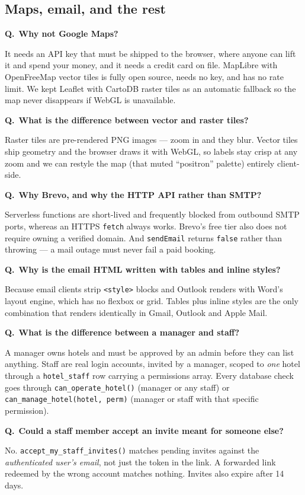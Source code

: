 \documentclass[11pt,a4paper]{article}
\newcommand{\Q}[1]{\vspace{7pt}\noindent\textbf{\color{primary}Q.}~\textbf{#1}\par\vspace{1pt}}
\newcommand{\A}[1]{\noindent #1\par}
\begin{document}
\subsection{Maps, email, and the rest}

\Q{Why not Google Maps?}
\A{It needs an API key that must be shipped to the browser, where anyone can lift
it and spend your money, and it needs a credit card on file. MapLibre with
OpenFreeMap vector tiles is fully open source, needs no key, and has no rate limit.
We kept Leaflet with CartoDB raster tiles as an automatic fallback so the map never
disappears if WebGL is unavailable.}

\Q{What is the difference between vector and raster tiles?}
\A{Raster tiles are pre-rendered PNG images --- zoom in and they blur. Vector tiles
ship geometry and the browser draws it with WebGL, so labels stay crisp at any
zoom and we can restyle the map (that muted ``positron'' palette) entirely
client-side.}

\Q{Why Brevo, and why the HTTP API rather than SMTP?}
\A{Serverless functions are short-lived and frequently blocked from outbound SMTP
ports, whereas an HTTPS \texttt{fetch} always works. Brevo's free tier also does not
require owning a verified domain. And \texttt{sendEmail} returns \texttt{false}
rather than throwing --- a mail outage must never fail a paid booking.}

\Q{Why is the email HTML written with tables and inline styles?}
\A{Because email clients strip \texttt{<style>} blocks and Outlook renders with
Word's layout engine, which has no flexbox or grid. Tables plus inline styles are
the only combination that renders identically in Gmail, Outlook and Apple Mail.}

\Q{What is the difference between a manager and staff?}
\A{A manager owns hotels and must be approved by an admin before they can list
anything. Staff are real login accounts, invited by a manager, scoped to \emph{one}
hotel through a \texttt{hotel\_staff} row carrying a permissions array. Every
database check goes through \texttt{can\_operate\_hotel()} (manager or any staff)
or \texttt{can\_manage\_hotel(hotel, perm)} (manager or staff with that specific
permission).}

\Q{Could a staff member accept an invite meant for someone else?}
\A{No. \texttt{accept\_my\_staff\_invites()} matches pending invites against the
\emph{authenticated user's email}, not just the token in the link. A forwarded link
redeemed by the wrong account matches nothing. Invites also expire after 14 days.}
\end{document}
